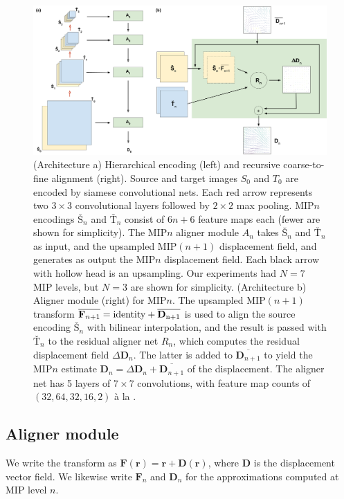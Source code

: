 \documentclass{article}
\renewcommand{\vec}[1]{\mathbf{#1}}
\begin{document}
\begin{figure}
	\centering
	\includegraphics[width=\textwidth]{Architecture.png}
	\caption[Architecture]{(Architecture a) Hierarchical encoding (left) and recursive coarse-to-fine alignment (right). Source and target images $S_0$ and $T_0$ are encoded by siamese convolutional nets. Each red arrow represents two $3\times 3$ convolutional layers followed by $2\times 2$ max pooling. MIP$n$ encodings $\text{\v{S}}_n$ and $\text{\v{T}}_n$ consist of $6n+6$ feature maps each (fewer are shown for simplicity). The MIP$n$ aligner module $A_n$ takes $\text{\v{S}}_n$ and $\text{\v{T}}_n$ as input, and the upsampled MIP$(n+1)$ displacement field, and generates as output the MIP$n$ displacement field. Each black arrow with hollow head is an upsampling. Our experiments had $N=7$ MIP levels, but $N=3$ are shown for simplicity. (Architecture b) Aligner module (right) for MIP$n$. The upsampled MIP$(n+1)$ transform $\overline{\vec{F}_{n+1}} = \rm{identity} + \overline{\vec{D}_{n+1}}$ is used to align the source encoding $\text{\v{S}}_n$ with bilinear interpolation, and the result is passed with $\text{\v{T}}_n$ to the residual aligner net $R_n$, which computes the residual displacement field $\Delta \vec{D}_n$. The latter is added to $\overline{\vec{D}_{n+1}}$ to yield the MIP$n$ estimate $\vec{D}_n=\Delta \vec{D}_n + \overline{\vec{D}_{n+1}}$ of the displacement. The aligner net has 5 layers of $7\times 7$ convolutions, with feature map counts of $(32, 64, 32, 16, 2)$ à la \citet{ranjan2017optical}.}\label{fig:architecture}
\end{figure}

\subsection{Aligner module}
We write the transform as $\vec{F}(\vec{r}) = \vec{r} + \vec{D}(\vec{r})$, where $\vec{D}$ is the displacement vector field. We likewise write $\vec{F}_n$ and $\vec{D}_n$ for the approximations computed at MIP level $n$.
\end{document}
